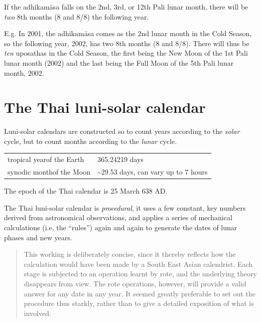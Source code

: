\documentclass[11pt,oneside]{memoir-article}
\begin{document}
If the adhikamāsa falls on the 2nd, 3rd, or 12th Pali lunar month,
there will be \emph{two} 8th months (8 and 8/8) the following year.

E.g. In 2001, the adhikamāsa comes as the 2nd lunar month in the
Cold Season, so the following year, 2002, has two 8th months (8 and
8/8). There will thus be \emph{ten} uposathas in the Cold Season, the
first being the New Moon of the 1st Pali lunar month (2002) and the
last being the Full Moon of the 5th Pali lunar month, 2002.

\clearpage
\chapter{The Thai luni-solar calendar}
\label{sec-4}

Luni-solar calendars are constructed so to count years according to
the \emph{solar} cycle, but to count months according to the \emph{lunar} cycle.

\begin{center}
\begin{tabular}{ll}
tropical year\footnotemark\space of the Earth & 365.24219 days\\
synodic month\footnotemark\space of the Moon & \textasciitilde{}29.53 days, can vary up to 7 hours\\
\end{tabular}
\end{center}

The epoch of the Thai calendar is 25 March 638 AD.

The Thai luni-solar calendar is \emph{procedural}, it uses a few constant,
key numbers derived from astronomical observations, and applies a
series of mechanical calculations (i.e. the ``rules'') again and again
to generate the dates of lunar phases and new years.

\begin{quote}
This working is deliberately concise, since it thereby reflects how
the calculation would have been made by a South East Asian calendrist.
Each stage is subjected to an operation learnt by rote, and the
underlying theory disappears from view. The rote operations, however,
will provide a valid answer for any date in any year. It seemed
greatly preferable to set out the procedure thus starkly, rather than
to give a detailed exposition of what is involved.\cite{eade-interpolation}
\end{quote}
\end{document}
